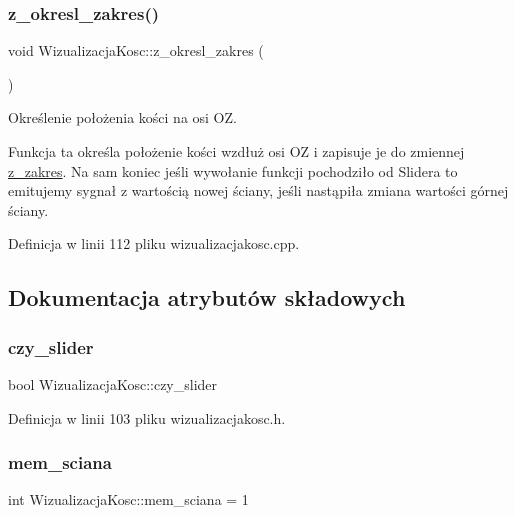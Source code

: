 \subsubsection{\texorpdfstring{z\+\_\+okresl\+\_\+zakres()}{z\_okresl\_zakres()}}
{\footnotesize\ttfamily void Wizualizacja\+Kosc\+::z\+\_\+okresl\+\_\+zakres (\begin{DoxyParamCaption}{ }\end{DoxyParamCaption})}



Określenie położenia kości na osi OZ. 

Funkcja ta określa położenie kości wzdłuż osi OZ i zapisuje je do zmiennej \hyperlink{class_wizualizacja_kosc_abec9f7c00196751f1f97e8845a9c7d21}{z\+\_\+zakres}. Na sam koniec jeśli wywołanie funkcji pochodziło od Slidera to emitujemy sygnał z wartością nowej ściany, jeśli nastąpiła zmiana wartości górnej ściany. 

Definicja w linii 112 pliku wizualizacjakosc.\+cpp.



\subsection{Dokumentacja atrybutów składowych}
\mbox{\label{class_wizualizacja_kosc_a25d14786810ffb0496b4cd8492fcb03f}} 
\subsubsection{\texorpdfstring{czy\+\_\+slider}{czy\_slider}}
{\footnotesize\ttfamily bool Wizualizacja\+Kosc\+::czy\+\_\+slider}



Definicja w linii 103 pliku wizualizacjakosc.\+h.

\mbox{\label{class_wizualizacja_kosc_a2b489f7583deecf0d6b74ac0771e2ec2}} 
\subsubsection{\texorpdfstring{mem\+\_\+sciana}{mem\_sciana}}
{\footnotesize\ttfamily int Wizualizacja\+Kosc\+::mem\+\_\+sciana = 1}


